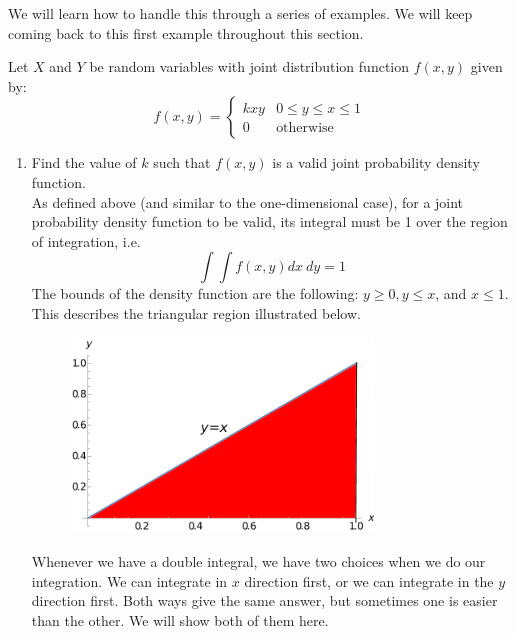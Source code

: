 \documentclass[notes.tex]{subfiles}
\begin{document}
We will learn how to handle this through a series of examples. We will keep coming back to this first example throughout this section.

\begin{example}Let $X$ and $Y$ be random variables with joint distribution function $f(x, y)$ given by:
\[
f(x, y) = \begin{cases} 
      k x y  & 0 \leq y \leq x \leq 1 \\
      0 & \textrm{otherwise}
   \end{cases}
\]

\begin{enumerate}
\item Find the value of $k$ such that $f(x, y)$ is a valid joint probability density function. \\

As defined above (and similar to the one-dimensional case), for a joint probability density function to be valid, its integral must be 1 over the region of integration, i.e.
\[
\int \int f(x, y) dx \: dy = 1
\]
The bounds of the density function are the following: $y \geq 0, y \leq x$, and $x \leq 1$. This describes the triangular region illustrated below.

\begin{figure}[H]
\centering
\includegraphics[width=8cm]{region1}
\end{figure}

Whenever we have a double integral, we have two choices when we do our integration. We can integrate in $x$ direction first, or we can integrate in the $y$ direction first. Both ways give the same answer, but sometimes one is easier than the other. We will show both of them here. \\


\end{enumerate}
\end{example}
\end{document}
